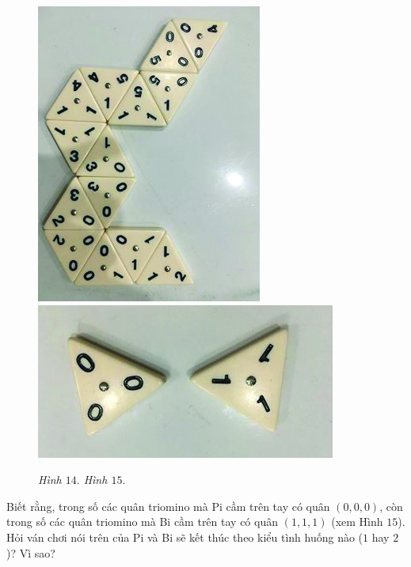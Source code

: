 	\begin{figure}[H]
		\centering
		\vspace*{-5pt}
		\captionsetup{labelformat=empty, justification=centering}
		\includegraphics[height=0.3\textwidth,angle=90]{h9}
		\includegraphics[height=0.225\textwidth]{h10}
		\caption{\textit{\small Hình $14.$ \hspace*{75pt} Hình $15.$}}
		\vspace*{-8pt}
	\end{figure}
	Biết rằng, trong số các quân triomino mà Pi cầm trên tay có quân $(0, 0, 0)$, còn trong số các quân triomino mà Bi cầm trên tay có quân $(1, 1, 1)$ (xem Hình $15$).
	\vskip 0.1cm
	Hỏi ván chơi nói trên của Pi và Bi sẽ kết thúc theo kiểu tình huống nào ($1$ hay $2$)? Vì sao?
